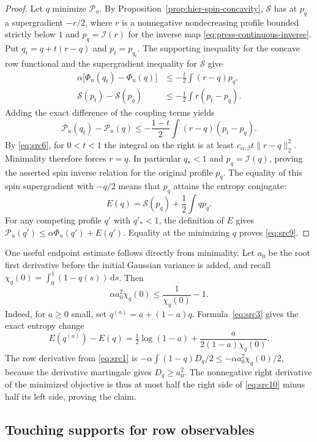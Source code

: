 \documentclass[11pt,a4paper]{article}
\numberwithin{equation}{section}
\theoremstyle{definition}
\theoremstyle{remark}
\newcommand{\dd}{\mathrm d}
\begin{document}
\begin{proof}
Let $q$ minimize $\mathcal P_u$. By
Proposition~\ref{prop:hier-spin-concavity}, $\mathcal S$ has at $p_q$ a
supergradient $-r/2$, where $r$ is a nonnegative nondecreasing profile bounded
strictly below $1$ and $p_q=\mathcal I(r)$ for the inverse map
\eqref{eq:press-continuous-inverse}. Put $q_t=q+t(r-q)$ and $p_t=p_{q_t}$.
The supporting inequality for the concave row functional and the
supergradient inequality for $\mathcal S$ give
\[
 \begin{split}
 \alpha\big[\Phi_u(q_t)-\Phi_u(q)\big]
   &\le-\frac t2\int(r-q)p_q,\\
 \mathcal S(p_t)-\mathcal S(p_q)
   &\le-\frac12\int r(p_t-p_q).
 \end{split}
\]
Adding the exact difference of the coupling terms yields
\[
 \mathcal P_u(q_t)-\mathcal P_u(q)
 \le-\frac{1-t}{2}\int(r-q)(p_t-p_q).
\]
By \eqref{eq:src6}, for $0<t<1$ the integral on the right is at least
$c_{\alpha,\beta}t\|r-q\|_2^2$. Minimality therefore forces $r=q$.
In particular $q_*<1$ and $p_q=\mathcal I(q)$, proving the asserted spin
inverse relation for the original profile $p_q$. The equality of this spin
supergradient with $-q/2$
means that $p_q$ attains the entropy conjugate:
\[
 E(q)=\mathcal S(p_q)+\frac12\int q p_q.
\]
For any competing profile $q'$ with $q'_*<1$, the definition of $E$ gives
$\mathcal P_u(q')\le\alpha\Phi_u(q')+E(q')$. Equality at the minimizing $q$
proves \eqref{eq:src9}.
\end{proof}

One useful endpoint estimate follows directly from minimality. Let $a_0$
be the root first derivative before the initial Gaussian variance is added,
and recall $\chi_q(0)=\int_0^1(1-q(s))\,\dd s$. Then
\begin{equation}\label{eq:src10}
 \alpha a_0^2\chi_q(0)\le\frac1{\chi_q(0)}-1.
\end{equation}
Indeed, for $a\ge0$ small, set $q^{(a)}=a+(1-a)q$. Formula~\eqref{eq:src3}
gives the exact entropy change
\[
 E(q^{(a)})-E(q)=\tfrac12\log(1-a)
                +\frac{a}{2(1-a)\chi_q(0)}.
\]
The row derivative from \eqref{eq:src1} is
$-\alpha\int(1-q)D_q/2\le-\alpha a_0^2\chi_q(0)/2$, because the derivative
martingale gives $D_q\ge a_0^2$. The nonnegative right derivative of the
minimized objective is thus at most half the right side of
\eqref{eq:src10} minus half its left side, proving the claim.

\subsection{Touching supports for row observables}
\end{document}
